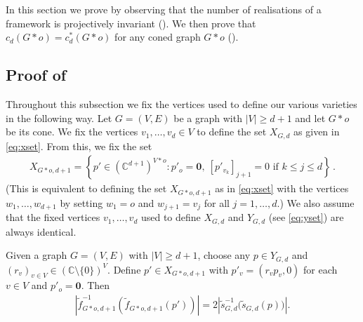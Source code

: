 \documentclass[ALCO]{cedram}
\begin{document}
In this section we prove  by observing that the number of realisations of a framework is projectively invariant ().
We then prove that $c_d(G*o) = c_d^*(G*o)$ for any coned graph $G*o$ ().

\subsection{Proof of \texorpdfstring{}{Theorem 1.2}}

Throughout this subsection we fix the vertices used to define our various varieties in the following way.
Let $G=(V,E)$ be a graph with $|V| \geq d+1$ and let $G*o$ be its cone.
We fix the vertices $v_1,\ldots, v_d \in V$ to define the set $X_{G,d}$ as given in \eqref{eq:xset}.
From this, we fix the set
\begin{align*}
	X_{G*o,d+1} = \left\{ p' \in (\mathbb{C}^{d+1})^{V*o} : p'_o = \mathbf{0}, ~  [p'_{v_k}]_{j+1}=0 \text{ if } k \leq j \leq d  \right\}\,.
\end{align*}
(This is equivalent to defining the set $X_{G*o,d+1}$ as in \eqref{eq:xset} with the vertices $w_1,\ldots,  w_{d+1}$ by setting $w_1 = o$ and $w_{j+1} = v_j$ for all $j =1,\ldots, d$.)
We also assume that the fixed vertices $v_1,\ldots,v_d$ used to define $X_{G,d}$ and $Y_{G,d}$ (see \eqref{eq:yset}) are always identical.



\begin{lemma}\label{kl:proj}
	Given a graph $G=(V,E)$ with $|V| \geq d+1$,
	choose any $p \in Y_{G,d}$ and $(r_v)_{v \in V} \in (\mathbb{C}\setminus \{0\})^{V}$.
	Define $p' \in X_{G*o,d+1}$ with $p'_v = (r_vp_v,0)$ for each $v \in V$ and $p'_o=\mathbf{0}$.
	Then
	\begin{align*}
		\left| \tilde{f}_{G*o,d+1}^{-1}\left(\tilde{f}_{G*o,d+1}(p') \right) \right| = 2 \left| \tilde{s}_{G,d}^{-1}\Big(\tilde{s}_{G,d}(p) \Big) \right|.
	\end{align*} 
\end{lemma}
\end{document}

